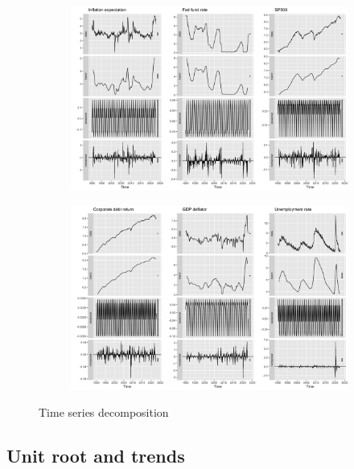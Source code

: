 \documentclass[hidelinks,12pts]{article}
\DeclareMathOperator{\1}{\mathbbm{1}}
\begin{document}
\begin{figure}[h!]
    \centering
    \begin{subfigure}[b]{0.75\textwidth}
        \centering
        \includegraphics[width=\textwidth]{IMAGES/decomposition_i.png}
        \caption*{}
    \end{subfigure}
    \hfill
    \begin{subfigure}[b]{0.75\textwidth}
        \centering
        \includegraphics[width=\textwidth]{IMAGES/decomposition_ii.png}
        \caption*{}
    \end{subfigure}
    \hfill 
    \caption{Time series decomposition}
    \label{fig:decomposition}
\end{figure}

    \subsection{Unit root and trends}
\end{document}
